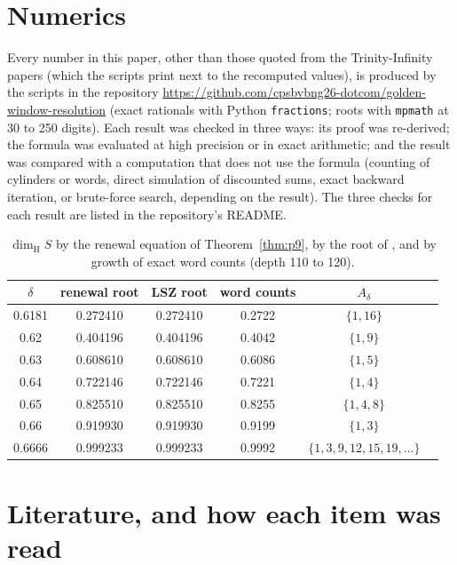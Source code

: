 \documentclass[11pt]{amsart}
\theoremstyle{remark}
\newcommand{\dimH}{\dim_{\mathrm H}}
\begin{document}
\section{Numerics}\label{sec:numerics}

Every number in this paper, other than those quoted from the Trinity-Infinity papers (which the scripts print next to the recomputed values), is produced by the scripts in the repository \url{https://github.com/cpsbvbng26-dotcom/golden-window-resolution} (exact rationals with Python \texttt{fractions}; roots with \texttt{mpmath} at 30 to 250 digits). Each result was checked in three ways: its proof was re-derived; the formula was evaluated at high precision or in exact arithmetic; and the result was compared with a computation that does not use the formula (counting of cylinders or words, direct simulation of discounted sums, exact backward iteration, or brute-force search, depending on the result). The three checks for each result are listed in the repository's README.

\begin{table}[h]
\centering
\begin{tabular}{cccccc}
\toprule
$\delta$ & renewal root & LSZ root & word counts & $A_\delta$\\
\midrule
0.6181 & 0.272410 & 0.272410 & 0.2722 & $\{1,16\}$\\
0.62 & 0.404196 & 0.404196 & 0.4042 & $\{1,9\}$\\
0.63 & 0.608610 & 0.608610 & 0.6086 & $\{1,5\}$\\
0.64 & 0.722146 & 0.722146 & 0.7221 & $\{1,4\}$\\
0.65 & 0.825510 & 0.825510 & 0.8255 & $\{1,4,8\}$\\
0.66 & 0.919930 & 0.919930 & 0.9199 & $\{1,3\}$\\
0.6666 & 0.999233 & 0.999233 & 0.9992 & $\{1,3,9,12,15,19,\dots\}$\\
\bottomrule
\end{tabular}
\caption{$\dimH S$ by the renewal equation of Theorem~\ref{thm:p9}, by the root of \cite[Theorem~1.2]{LSZ}, and by growth of exact word counts (depth 110 to 120).}
\end{table}

\section{Literature, and how each item was read}\label{sec:lit}
\end{document}
